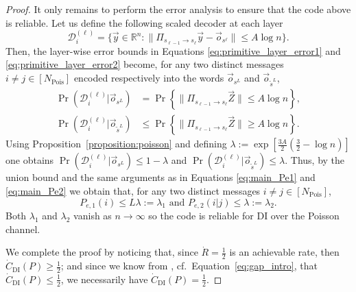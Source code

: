 \documentclass[10pt, conference]{IEEEtran}
\newcommand{\1}{\mathds{1}}
\newcommand{\RR}{\mathbb{R}}
\newcommand{\cD}{\mathcal{D}}
\begin{document}
\begin{proof}
It only remains to perform the error analysis to ensure that the code above is reliable. Let us define the following scaled decoder at each layer
\begin{equation}\label{eq:layer-decoder-poisson}
\cD_{i}^{(\ell)}=\{\vec{y}\in\RR^n:\|\Pi_{s_{\ell-1}\to s_{\ell}}\vec{y}-\vec{o}_{s^\ell}\|\leq A\log n\}.
\end{equation}
Then, the layer-wise error bounds in Equations \eqref{eq:primitive_layer_error1} and \eqref{eq:primitive_layer_error2} become, for any two distinct messages $i\neq j\in[N_{\text{Pois}}]$ encoded respectively into the words $\vec o_{s^L}$ and $\vec o_{\tilde s^L}$,
\begin{align}
    \Pr(\cD_i^{(\ell)}|\vec o_{s^L})&=\Pr\left\{\|\Pi_{s_{\ell-1}\to s_{\ell}}\vec{Z}\|\leq A\log n\right\},\\
    \Pr(\cD_i^{(\ell)}|\vec o_{\tilde s^L})&\leq\Pr\left\{\|\Pi_{s_{\ell-1}\to s_{\ell}}\vec{Z}\|\geq A\log n\right\}.
\end{align}
Using Proposition~\ref{proposition:poisson} and defining $\lambda:=\exp\left[\frac{3A}{2}\left(\frac32-\log n\right)\right]$ one obtains $\Pr(\cD_i^{(\ell)}|\vec o_{s^L})\leq1-\lambda$ and $\Pr(\cD_i^{(\ell)}|\vec o_{\tilde s^L})\leq \lambda$. Thus, by the union bound and the same arguments as in Equations \eqref{eq:main_Pe1} and \eqref{eq:main_Pe2} we obtain that, for any two distinct messages $i\neq j\in[N_{\text{Pois}}]$,
\begin{equation}
    P_{e,1}(i)\leq L\lambda:=\lambda_1\,\,\text{and}\,\,P_{e,2}(i|j)\leq \lambda:=\lambda_2.
\end{equation}
Both $\lambda_1$ and $\lambda_2$ vanish as $n\to\infty$ so the code is reliable for DI over the Poisson channel. 

We complete the proof by noticing that, since $\dot R=\frac12$ is an achievable rate, then $\dot{C}_\text{DI}(P)\geq\frac12$; and since we know from \cite{CDBW:DI_classical}, cf.~Equation~\eqref{eq:gap_intro}, that $\dot{C}_\text{DI}(P)\leq\frac12$, we necessarily have $\dot{C}_\text{DI}(P)=\frac12$.
\end{proof}



\end{document}
